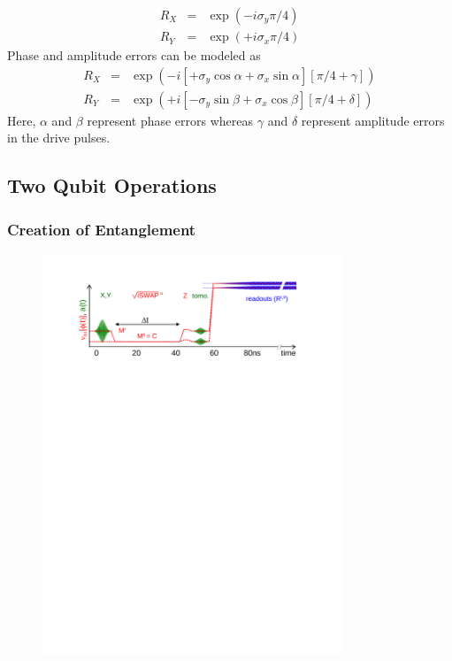 \begin{eqnarray}
R_{X} & = & \exp{\left( -i \sigma_y \pi / 4\right)} \\
R_{Y} & = & \exp{\left( +i \sigma_x \pi / 4\right)} 
\end{eqnarray}
Phase and amplitude errors can be modeled as
\begin{eqnarray}
R_{X} & = & \exp{\left( -i \left[+\sigma_y\cos{\alpha}+\sigma_x\sin{\alpha} \right] \left[\pi / 4+\gamma\right]\right)} \\
R_{Y} & = & \exp{\left( +i \left[-\sigma_y\sin{\beta}+\sigma_x\cos{\beta}\right] \left[\pi / 4+\delta\right]\right)} 
\end{eqnarray}
Here, $\alpha$ and $\beta$ represent phase errors whereas $\gamma$ and $\delta$ represent amplitude errors in the drive pulses.

\subsection{Two Qubit Operations}

\subsubsection{Creation of Entanglement}

\begin{figure}
	\centering
		\includegraphics[width=0.8\textwidth]{./material/papers/iswap/figures/iswap_gate_pulse_sequence}
	\label{fig:ISwapPulseSequence}
	\caption{}
\end{figure}

